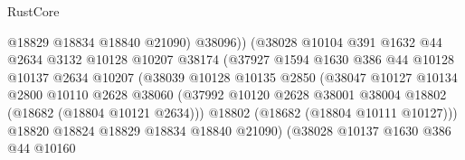 \begin{lexlean}{RustCore}
\begin{coremodule}
                                        @18829
                                        @18834
                                        @18840
                                        @21090)
                                      @38096))
                                  (@38028
                                    @10104
                                    @391
                                    @1632
                                    @44
                                    @2634
                                    @3132
                                    @10128
                                    @10207
                                    @38174
                                    (@37927
                                      @1594
                                      @1630
                                      @386
                                      @44
                                      @10128
                                      @10137
                                      @2634
                                      @10207
                                      (@38039
                                        @10128
                                        @10135
                                        @2850
                                        (@38047
                                          @10127
                                          @10134
                                          @2800
                                          @10110
                                          @2628
                                          @38060
                                          (@37992
                                            @10120
                                            @2628
                                            @38001
                                            @38004
                                            @18802
                                            (@18682 (@18804 @10121 @2634)))
                                          @18802
                                          (@18682 (@18804 @10111 @10127)))
                                        @18820
                                        @18824
                                        @18829
                                        @18834
                                        @18840
                                        @21090)
                                      (@38028
                                        @10137
                                        @1630
                                        @386
                                        @44
                                        @10160

\end{coremodule}
\end{lexlean}
